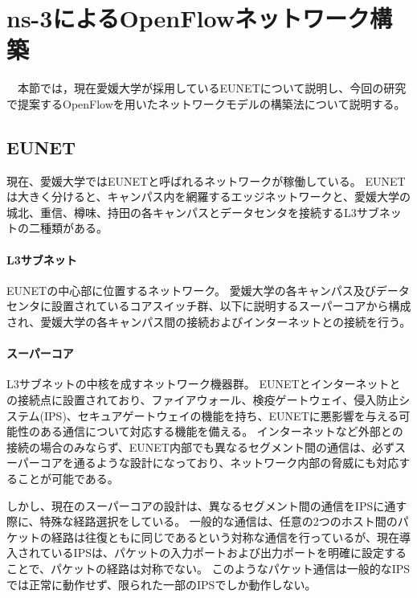 \chapter{ns-3によるOpenFlowネットワーク構築}

　本節では，現在愛媛大学が採用しているEUNETについて説明し、今回の研究で提案するOpenFlowを用いたネットワークモデルの構築法について説明する。

\section{EUNET}

現在、愛媛大学ではEUNETと呼ばれるネットワークが稼働している。
EUNETは大きく分けると、キャンパス内を網羅するエッジネットワークと、愛媛大学の城北、重信、樽味、持田の各キャンパスとデータセンタを接続するL3サブネットの二種類がある。

\subsubsection{L3サブネット}

EUNETの中心部に位置するネットワーク。
愛媛大学の各キャンパス及びデータセンタに設置されているコアスイッチ群、以下に説明するスーパーコアから構成され、愛媛大学の各キャンパス間の接続およびインターネットとの接続を行う。

\subsubsection{スーパーコア}

L3サブネットの中核を成すネットワーク機器群。
EUNETとインターネットとの接続点に設置されており、ファイアウォール、検疫ゲートウェイ、侵入防止システム(IPS)、セキュアゲートウェイの機能を持ち、EUNETに悪影響を与える可能性のある通信について対応する機能を備える。
インターネットなど外部との接続の場合のみならず、EUNET内部でも異なるセグメント間の通信は、必ずスーパーコアを通るような設計になっており、ネットワーク内部の脅威にも対応することが可能である。

しかし、現在のスーパーコアの設計は、異なるセグメント間の通信をIPSに通す際に、特殊な経路選択をしている。
一般的な通信は、任意の2つのホスト間のパケットの経路は往復ともに同じであるという対称な通信を行っているが、現在導入されているIPSは、パケットの入力ポートおよび出力ポートを明確に設定することで、パケットの経路は対称でない。
このようなパケット通信は一般的なIPSでは正常に動作せず、限られた一部のIPSでしか動作しない。

